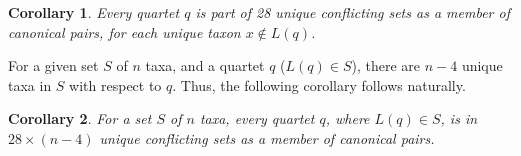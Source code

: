 \documentclass[10pt,a4paper]{article}
\newcommand{\add}[1]{{\color{blue} #1}}
\newcommand{\addb}[1]{{\color{red} #1}}
\newtheorem{corollary}{Corollary}[theorem]
\begin{document}


\begin{corollary}
\label{cor:unique-conflict}
Every quartet $q$ is part of 28 unique conflicting sets as a member of canonical pairs, for each unique taxon $x \notin L(q) $.
\end{corollary}

For a given set $S$ of $n$ taxa, and a quartet $q$ ($L(q) \in S$), there are $n-4$ unique taxa in $S$ with respect to $q$. Thus, the following corollary follows naturally.

\begin{corollary}
\label{cor:total_unique_conflict}
For a set $S$ of $n$ taxa, every quartet $q$, where $L(q) \in S$, is in $28 \times (n-4)$ unique conflicting sets as a member of canonical pairs.
\end{corollary}

\end{document}

